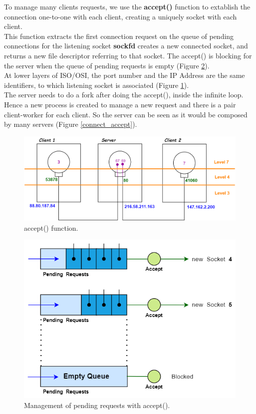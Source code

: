 To manage many clients requests, we use the \textbf{accept()} function to extablish the connection one-to-one with each client, creating a uniquely socket with each client.\\
This function extracts the  first   connection request on the queue of pending connections for the listening socket \textbf{sockfd} creates a new connected socket, and returns a new file descriptor  referring  to that socket. The accept() is blocking for the server when the queue of pending requests is empty (Figure \ref{pending_accept}).\\
At lower layers of ISO/OSI, the port number and the IP Address are the same identifiers, to which listening socket is associated (Figure \ref{accept}).\\
The server needs to do a fork after doing the accept(), inside the infinite loop. Hence a new process is created to manage a new request and there is a pair client-worker for each client. So the server can be seen as it would be composed by many servers (Figure \ref{connect_accept}). 
 
\begin{figure}[H]
\centering
\includegraphics[scale=0.4]{Images/NetworkC/accept}\caption{\footnotesize{accept() function.}}\label{accept}
\end{figure}

\begin{figure}[H]
\centering
\includegraphics[scale=0.4]{Images/NetworkC/pending_accept}\caption{\footnotesize{Management of pending requests with accept().}}\label{pending_accept}
\end{figure}

